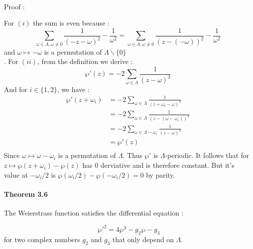 \documentclass[letterpaper,10pt]{article}
\begin{document}
{\itshape \paragraph{} Proof :}
For $(i)$ the sum is even because : \[\sum_{\omega \in \Lambda , \omega \neq 0 }\frac{1}{(-z - \omega)^2} - \frac{1}{\omega^2} = 
 \sum_{\omega \in \Lambda , \omega \neq 0 }\frac{1}{(z -(- \omega))^2} - \frac{1}{\omega^2}\] and $\omega \mapsto -\omega$ is 
 a permutation of $\Lambda\backslash \{0\}$\\.
For $(ii)$, from the definition we derive : \[ \wp'(z) = -2\sum_{\omega\in\Lambda} \frac{1}{(z-\omega)^3} \]
And for $i\in \{1,2\}$, we have : \begin{align*} \wp'(z + \omega_i) &= -2\sum_{\omega\in\Lambda} \frac{1}{(z + \omega_i-\omega)^3}\\
  &= -2\sum_{\omega\in\Lambda} \frac{1}{(z - (\omega-\omega_i))^3}\\
  &= -2\sum_{\omega\in\Lambda - \omega_i} \frac{1}{(z - \omega)^3}\\
  &= \wp'(z)\\
\end{align*}%
Since $\omega \mapsto \omega-\omega_i$ is a permutation of $\Lambda$. Thus $\wp'$ is  $\Lambda$-periodic.
It follows that for $z\mapsto \wp(z + \omega_i) - \wp(z)$ has 0 derviative and is therefore constant. But it's value at $-\omega_i/2$ is 
$\wp(\omega_i/2) - \wp(-\omega_i/2) = 0$ by parity.

\paragraph{Theorem 3.6} The Weierstrass function satisfies the differential equation : 

\[\ \wp'^2 = 4\wp^3 - g_2\wp - g_3 \] for two complex numbers $g_2$ and $g_3$ that only depend on $\Lambda$.
\end{document}
